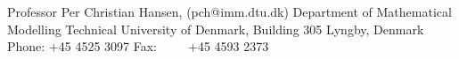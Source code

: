 \documentclass[12pt,a4paper]{article}
\begin{document}
\noindent Professor Per Christian Hansen, (pch@imm.dtu.dk)\newline
Department of Mathematical Modelling \newline
Technical University of Denmark, Building 305  Lyngby, Denmark \newline
Phone: +45 4525 3097 \newline
Fax:\ \ \ \ \  +45 4593 2373\newline




\end{document}
